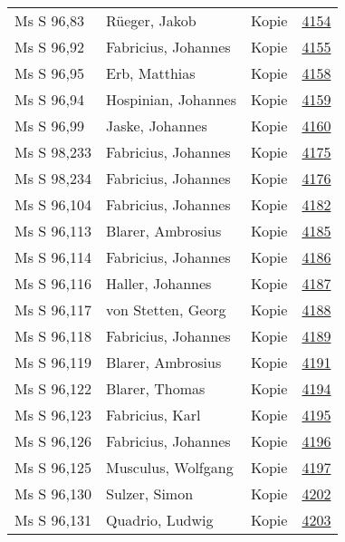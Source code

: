 \documentclass[10pt,a4paper,landscape]{report}
\begin{document}
\begin{longtable}{p{16cm}p{4cm}lr}
Ms S 96,83	&	Rüeger, Jakob	&	Kopie	&	\href{http://130.60.24.72/assignment/4154}{4154}\\
Ms S 96,92	&	Fabricius, Johannes	&	Kopie	&	\href{http://130.60.24.72/assignment/4155}{4155}\\
Ms S 96,95	&	Erb, Matthias	&	Kopie	&	\href{http://130.60.24.72/assignment/4158}{4158}\\
Ms S 96,94	&	Hospinian, Johannes	&	Kopie	&	\href{http://130.60.24.72/assignment/4159}{4159}\\
Ms S 96,99	&	Jaske, Johannes	&	Kopie	&	\href{http://130.60.24.72/assignment/4160}{4160}\\
Ms S 98,233	&	Fabricius, Johannes	&	Kopie	&	\href{http://130.60.24.72/assignment/4175}{4175}\\
Ms S 98,234	&	Fabricius, Johannes	&	Kopie	&	\href{http://130.60.24.72/assignment/4176}{4176}\\
Ms S 96,104	&	Fabricius, Johannes	&	Kopie	&	\href{http://130.60.24.72/assignment/4182}{4182}\\
Ms S 96,113	&	Blarer, Ambrosius	&	Kopie	&	\href{http://130.60.24.72/assignment/4185}{4185}\\
Ms S 96,114	&	Fabricius, Johannes	&	Kopie	&	\href{http://130.60.24.72/assignment/4186}{4186}\\
Ms S 96,116	&	Haller, Johannes	&	Kopie	&	\href{http://130.60.24.72/assignment/4187}{4187}\\
Ms S 96,117	&	von Stetten, Georg	&	Kopie	&	\href{http://130.60.24.72/assignment/4188}{4188}\\
Ms S 96,118	&	Fabricius, Johannes	&	Kopie	&	\href{http://130.60.24.72/assignment/4189}{4189}\\
Ms S 96,119	&	Blarer, Ambrosius	&	Kopie	&	\href{http://130.60.24.72/assignment/4191}{4191}\\
Ms S 96,122	&	Blarer, Thomas	&	Kopie	&	\href{http://130.60.24.72/assignment/4194}{4194}\\
Ms S 96,123	&	Fabricius, Karl	&	Kopie	&	\href{http://130.60.24.72/assignment/4195}{4195}\\
Ms S 96,126	&	Fabricius, Johannes	&	Kopie	&	\href{http://130.60.24.72/assignment/4196}{4196}\\
Ms S 96,125	&	Musculus, Wolfgang	&	Kopie	&	\href{http://130.60.24.72/assignment/4197}{4197}\\
Ms S 96,130	&	Sulzer, Simon	&	Kopie	&	\href{http://130.60.24.72/assignment/4202}{4202}\\
Ms S 96,131	&	Quadrio, Ludwig	&	Kopie	&	\href{http://130.60.24.72/assignment/4203}{4203}\\

\end{longtable}
\end{document}
